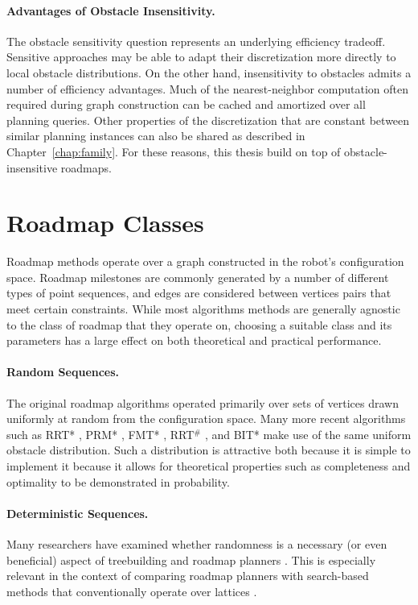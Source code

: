 \paragraph{Advantages of Obstacle Insensitivity.}
The obstacle sensitivity question represents an underlying efficiency
tradeoff.
Sensitive approaches may be able to adapt their discretization more
directly to local obstacle distributions.
On the other hand,
insensitivity to obstacles admits a number of efficiency advantages.
Much of the nearest-neighbor computation
often required during graph construction can be cached and amortized
over all planning queries.
Other properties of the discretization that are constant between
similar planning instances can also be shared
as described in Chapter~\ref{chap:family}.
For these reasons,
this thesis build on top of obstacle-insensitive roadmaps.

\section{Roadmap Classes}
\label{sec:roadmaps:roadmap-classes}

Roadmap methods operate over a graph constructed in the
robot's configuration space.
Roadmap milestones are commonly generated by a number of different
types of point sequences,
and edges are considered between vertices pairs that meet
certain constraints.
While most algorithms methods are generally agnostic
to the class of roadmap that they operate on,
choosing a suitable class and its parameters has a large effect
on both theoretical and practical performance.

\paragraph{Random Sequences.}
The original roadmap algorithms
\citep{kavrakietal1996prm}
operated primarily over sets
of vertices drawn uniformly at random from the configuration space.
Many more recent algorithms such as
RRT* \citep{karaman2010rrtstar},
PRM* \citep{karaman2011samplingoptimal},
FMT* \citep{janson2015fmtstar},
RRT$^{\#}$ \citep{arslan2013rrtsharp},
and BIT* \citep{gammell2015bitstar} make use of the same
uniform obstacle distribution.
Such a distribution is attractive both because
it is simple to implement
it because it allows for theoretical properties such as
completeness and optimality to be demonstrated
in probability.

\paragraph{Deterministic Sequences.}
Many researchers have examined whether randomness is a necessary
(or even beneficial) aspect of treebuilding and roadmap planners
\citep{branicky2002detvsprobroadmaps}.
This is especially relevant in the context of comparing
roadmap planners with search-based methods
that conventionally operate over lattices \citep{lavalle2002gridprms}.


